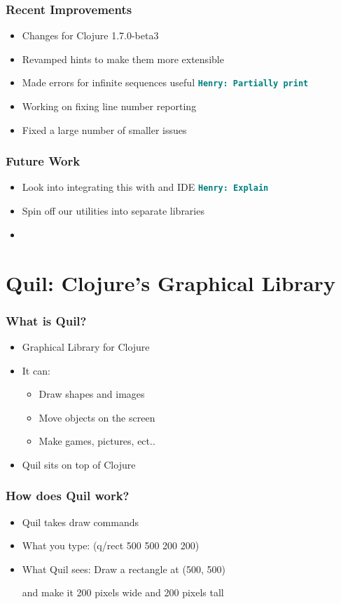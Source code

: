 \documentclass{beamer}
\newcommand{\comment}[1]{{\bf \tt  {#1}}}
\newcommand{\hfcomment}[1]{\textcolor{Teal}{\comment{Henry: {#1}}}}
\begin{document}
\begin{frame}
	\frametitle{Recent Improvements}
	\begin{itemize}
		\item Changes for Clojure 1.7.0-beta3
		\item Revamped hints to make them more extensible
		\item Made errors for infinite sequences useful \hfcomment{Partially print}
		\item Working on fixing line number reporting
		\item Fixed a large number of smaller issues
	\end{itemize}
\end{frame}

\begin{frame}
	\frametitle{Future Work}
	\begin{itemize}
		\item Look into integrating this with and IDE \hfcomment{Explain}
		\item Spin off our utilities into separate libraries
		\item 
	\end{itemize}
\end{frame}




\section{Quil: Clojure's Graphical Library}

\begin{frame}
	\frametitle{What is Quil?}
	\begin{itemize}
  		\item Graphical Library for Clojure
  		\item It can:
  		\begin{itemize}
  	 		\item Draw shapes and images
  	 		\item Move objects on the screen
  	 		\item Make games, pictures, ect..
  		\end{itemize}
  		\item Quil sits on top of Clojure
	 \end{itemize}
\end{frame}

\begin{frame}
	\frametitle{How does Quil work?}
	\begin{itemize}
  		\item Quil takes draw commands
  	 	\item What you type: (q/rect 500 500 200 200)
  	 	\item What Quil sees: Draw a rectangle at (500, 500)\par 
  	 	and make it 200 pixels wide and 200 pixels tall
	 \end{itemize}
\end{frame}
\end{document}
